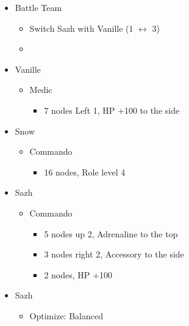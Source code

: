 	\begin{menu}
		\begin{itemize}
			\paradigm
			\begin{itemize}
				\item Battle Team
				      \begin{itemize}
					      \item Switch Sazh with Vanille (1 $\leftrightarrow$ 3)
					      \item {}%
					            {\paradigmline{(\med)}{\com}{(\com)}}%
					            {\paradigmline{(\sab)}{\com}{\com}}%
					            {\paradigmline{(\sab)}{\sen}{(\syn)}}%
					            {\paradigmline{(\rav)}{(\rav)}{(\syn)}}%
					            {\paradigmline[5]{\textit{(\sab)}}{\textit{(\rav)}}{\textit{\rav}}}%
					            {\paradigmline{\rav}{\rav}{\rav}}
				      \end{itemize}
			\end{itemize}
			\crystarium
			\begin{itemize}
				\item Vanille
				      \begin{itemize}
					      \item Medic
					            \begin{itemize}
						            \item 7 nodes Left 1, HP +100 to the side
					            \end{itemize}
				      \end{itemize}
				\item Snow
				      \begin{itemize}
					      \item Commando
					            \begin{itemize}
						            \item 16 nodes, Role level 4
					            \end{itemize}
				      \end{itemize}
				\item Sazh
				      \begin{itemize}
					      \item Commando
					            \begin{itemize}
						            \item 5 nodes up 2, Adrenaline to the top
						            \item 3 nodes right 2, Accessory to the side
						            \item 2 nodes, HP +100
					            \end{itemize}
				      \end{itemize}
			\end{itemize}
			\equip
			\begin{itemize}
				\item Sazh
				      \begin{itemize}
					      \item Optimize: Balanced
				      \end{itemize}
			\end{itemize}
		\end{itemize}
	\end{menu}


